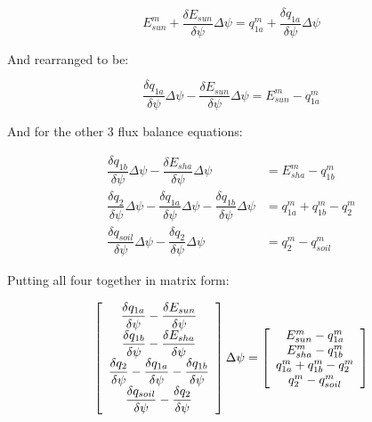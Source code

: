 \documentclass[draft,linenumbers]{agujournal}
\begin{document}
   \begin{linenomath*} \begin{equation} 
   E_{sun}^{m}+\dfrac{\delta E_{sun}}{\delta\psi}\Delta\psi=q_{1a}^{m}+\dfrac{\delta q_{1a}}{\delta\psi}\Delta\psi
   \end{equation} \end{linenomath*}

And rearranged to be:

   \begin{linenomath*} \begin{equation} 
   \dfrac{\delta q_{1a}}{\delta\psi}\Delta\psi-\dfrac{\delta E_{sun}}{\delta\psi}\Delta\psi=E_{sun}^{m}-q_{1a}^{m}
   \end{equation} \end{linenomath*}

And for the other 3 flux balance equations:

   \begin{linenomath*} \begin{equation} 
   \begin{aligned}
   \dfrac{\delta q_{1b}}{\delta\psi}\Delta\psi-\dfrac{\delta E_{sha}}{\delta\psi}\Delta\psi&=E_{sha}^{m}-q_{1b}^{m} \\
   \dfrac{\delta q_2}{\delta\psi}\Delta\psi-\dfrac{\delta q_{1a}}{\delta\psi}\Delta\psi-\dfrac{\delta q_{1b}}{\delta\psi}\Delta\psi&=q_{1a}^{m}+q_{1b}^{m}-q_2^{m} \\
   \dfrac{\delta q_{soil}}{\delta\psi}\Delta\psi-\dfrac{\delta q_2}{\delta\psi}\Delta\psi&=q_2^{m}-q_{soil}^{m}
   \end{aligned}
   \end{equation} \end{linenomath*}

Putting all four together in matrix form:

   \begin{linenomath*} \begin{equation} 
   \left[ \begin {array}{c}
   \dfrac{\delta q_{1a}}{\delta\psi}-\dfrac{\delta E_{sun}}{\delta\psi} \cr
   \dfrac{\delta q_{1b}}{\delta\psi}-\dfrac{\delta E_{sha}}{\delta\psi} \cr
   \dfrac{\delta q_2}{\delta\psi}-\dfrac{\delta q_{1a}}{\delta\psi}-\dfrac{\delta q_{1b}}{\delta\psi} \cr
   \dfrac{\delta q_{soil}}{\delta\psi}-\dfrac{\delta q_2}{\delta\psi}
   \end {array} \right]
   \Delta\psi=
   \left[ \begin {array}{c}
   E_{sun}^{m}-q_{1a}^{m} \cr
   E_{sha}^{m}-q_{1b}^{m} \cr
   q_{1a}^{m}+q_{1b}^{m}-q_2^{m} \cr
   q_2^{m}-q_{soil}^{m}
   \end {array} \right]
   \end{equation} \end{linenomath*}
\end{document}
